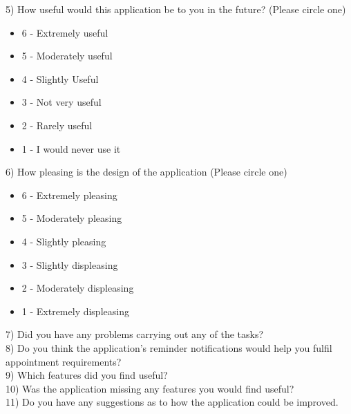 5) How useful would this application be to you in the future? (Please circle one)

\begin{itemize}
	\item 6 - Extremely useful
	\item 5 - Moderately useful
	\item 4 - Slightly Useful
	\item 3 - Not very useful
	\item 2 - Rarely useful
	\item 1 - I would never use it
\end{itemize}

6) How pleasing is the design of the application (Please circle one)

\begin{itemize}
	\item 6 - Extremely pleasing
	\item 5 - Moderately pleasing
	\item 4 - Slightly pleasing
	\item 3 - Slightly displeasing
	\item 2 - Moderately displeasing
	\item 1 - Extremely displeasing
\end{itemize}

7) Did you have any problems carrying out any of the tasks?
\\[1in]

8) Do you think the application's reminder notifications would help you fulfil appointment requirements?
\\[1in]

9) Which features did you find useful?
\\[1in]

10) Was the application missing any features you would find useful?
\\[1in]

11) Do you have any suggestions as to how the application could be improved.
\\[1in]